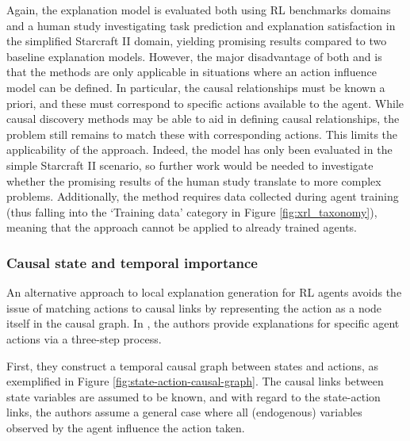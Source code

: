 \documentclass{article}
\begin{document}
Again, the explanation model is evaluated both using RL benchmarks domains and a human study investigating task prediction and explanation satisfaction in the simplified Starcraft II domain, yielding promising results compared to two baseline explanation models. However, the major disadvantage of both \cite{madumal2020distal} and \cite{madumal2020explainable} is that the methods are only applicable in situations where an action influence model can be defined. In particular, the causal relationships must be known a priori, and these must correspond to specific actions available to the agent. While causal discovery methods may be able to aid in defining causal relationships, the problem still remains to match these with corresponding actions. This limits the applicability of the approach. Indeed, the model has only been evaluated in the simple Starcraft II scenario, so further work would be needed to investigate whether the promising results of the human study translate to more complex problems. Additionally, the method requires data collected during agent training (thus falling into the `Training data' category in Figure \ref{fig:xrl_taxonomy}), meaning that the approach cannot be applied to already trained agents. 



\subsubsection{Causal state and temporal importance}

An alternative approach to local explanation generation for RL agents avoids the issue of matching actions to causal links by representing the action as a node itself in the causal graph. In \cite{wang2022causal}, the authors provide explanations for specific agent actions via a three-step process. 

First, they construct a temporal causal graph between states and actions, as exemplified in Figure \ref{fig:state-action-causal-graph}. The causal links between state variables are assumed to be known, and with regard to the state-action links, the authors assume a general case where all (endogenous) variables observed by the agent influence the action taken. 
\end{document}

